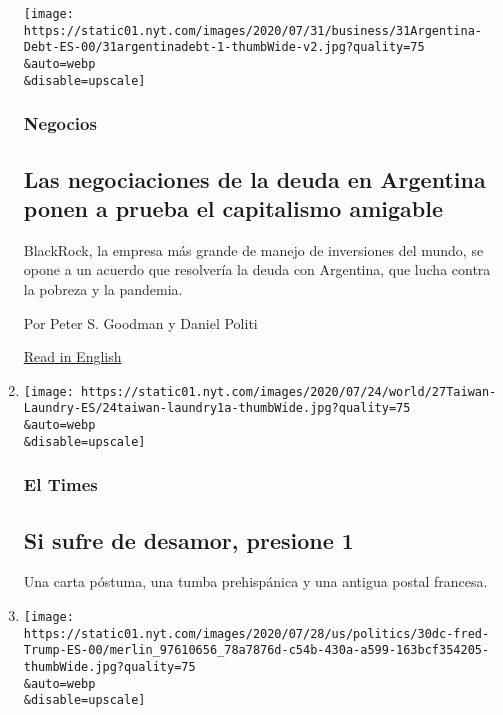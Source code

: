 \begin{enumerate}
  \texttt{[image: https://static01.nyt.com/images/2020/07/31/business/31Argentina-Debt-ES-00/31argentinadebt-1-thumbWide-v2.jpg?quality=75\\\&auto=webp\\\&disable=upscale]}

  \hypertarget{negocios}{%
  \subsubsection{Negocios}\label{negocios}}

  \hypertarget{las-negociaciones-de-la-deuda-en-argentina-ponen-a-prueba-el-capitalismo-amigable}{%
  \subsection{Las negociaciones de la deuda en Argentina ponen a prueba
  el capitalismo
  amigable}\label{las-negociaciones-de-la-deuda-en-argentina-ponen-a-prueba-el-capitalismo-amigable}}

  BlackRock, la empresa más grande de manejo de inversiones del mundo,
  se opone a un acuerdo que resolvería la deuda con Argentina, que lucha
  contra la pobreza y la pandemia.

  Por Peter S. Goodman y Daniel Politi

  \href{https://www.nytimes.com/2020/07/31/business/argentina-debt.html}{Read
  in English}
\item
  \href{/es/2020/07/31/espanol/elecciones-2020-trump-mexico-violencia.html}{}

  \texttt{[image: https://static01.nyt.com/images/2020/07/24/world/27Taiwan-Laundry-ES/24taiwan-laundry1a-thumbWide.jpg?quality=75\\\&auto=webp\\\&disable=upscale]}

  \hypertarget{el-times-1}{%
  \subsubsection{El Times}\label{el-times-1}}

  \hypertarget{si-sufre-de-desamor-presione-1}{%
  \subsection{Si sufre de desamor, presione
  1}\label{si-sufre-de-desamor-presione-1}}

  Una carta póstuma, una tumba prehispánica y una antigua postal
  francesa.
\item
  \href{/es/2020/07/31/espanol/estados-unidos/fred-trump-donald-trump.html}{}

  \texttt{[image: https://static01.nyt.com/images/2020/07/28/us/politics/30dc-fred-Trump-ES-00/merlin\_97610656\_78a7876d-c54b-430a-a599-163bcf354205-thumbWide.jpg?quality=75\\\&auto=webp\\\&disable=upscale]}


\end{enumerate}
